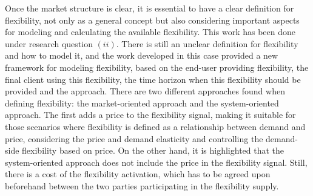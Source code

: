 Once the market structure is clear, it is essential to have a clear definition for flexibility, not only as a general concept but also considering important aspects for modeling and calculating the available flexibility. This work has been done under research question $(ii)$. There is still an unclear definition for flexibility and how to model it, and the work developed in this case provided a new framework for modeling flexibility, based on the end-user providing flexibility, the final client using this flexibility, the time horizon when this flexibility should be provided and the approach. There are two different approaches found when defining flexibility: the market-oriented approach and the system-oriented approach. The first adds a price to the flexibility signal, making it suitable for those scenarios where flexibility is defined as a relationship between demand and price, considering the price and demand elasticity and controlling the demand-side flexibility based on price. On the other hand, it is highlighted that the system-oriented approach does not include the price in the flexibility signal. Still, there is a cost of the flexibility activation, which has to be agreed upon beforehand between the two parties participating in the flexibility supply. 


